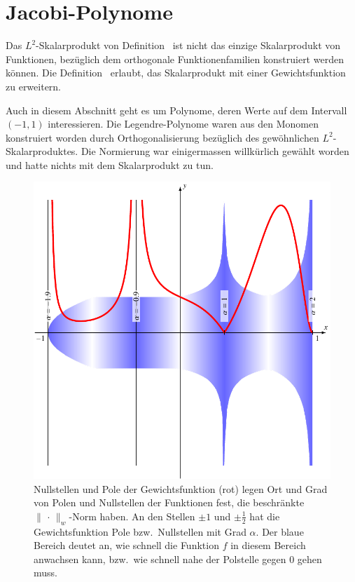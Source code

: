 %
%
%
\section{Jacobi-Polynome
\label{buch:integrale:subsection:jacobi-polynome}}
Das $L^2$-Skalarprodukt von
Definition~\label{buch:orthogonal:def:skalarprodukt}
ist nicht das einzige Skalarprodukt von Funktionen, bezüglich dem 
orthogonale Funktionenfamilien konstruiert werden können.
Die Definition~\label{buch:orthogonal:def:skalarproduktw}
erlaubt, das Skalarprodukt mit einer Gewichtsfunktion
zu erweitern.

Auch in diesem Abschnitt geht es um Polynome, deren Werte auf
dem Intervall $(-1,1)$ interessieren.
Die Legendre-Polynome waren aus den Monomen konstruiert worden durch
Orthogonalisierung bezüglich des gewöhnlichen $L^2$-Skalarproduktes.
Die Normierung war einigermassen willkürlich gewählt worden und
hatte nichts mit dem Skalarprodukt zu tun.

\begin{figure}
\centering
\includegraphics{chapters/070-orthogonalitaet/images/weight.pdf}
\caption{Nullstellen und Pole der Gewichtsfunktion (rot) legen Ort
und Grad von Polen und Nullstellen der Funktionen fest, die beschränkte
$\|\,\cdot\,\|_w$-Norm haben.
An den Stellen $\pm 1$ und $\pm\frac12$ hat die Gewichtsfunktion
Pole bzw.~Nullstellen mit Grad $\alpha$.
Der blaue Bereich deutet an, wie schnell die Funktion $f$ in diesem
Bereich anwachsen kann, bzw.~wie schnell nahe der Polstelle gegen $0$
gehen muss.
\label{buch:orthogonalitaet:fig:gewicht}}
\end{figure}
%
%
